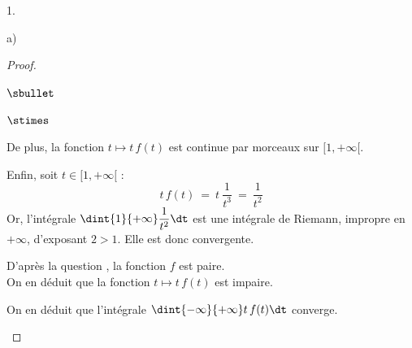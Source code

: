 \documentclass[11pt]{article}%
\begin{document}
\begin{noliste}{1.}
\begin{noliste}{a)}
\begin{proof}
\begin{noliste}{$\sbullet$}
\begin{noliste}{$\stimes$}
        \item De plus, la fonction $t \mapsto t \, f(t)$ est
          continue par morceaux sur $[1,+\infty[$.
          
        \item Enfin, soit $t \in [1,+\infty[$ :
          \[
          t \, f(t) \ = \ t \ \dfrac{1}{t^3} \ = \ \dfrac{1}{t^2}
          \]
          Or, l'intégrale $\dint{1}{+\infty} \dfrac{1}{t^2} \dt$ est
          une intégrale de Riemann, impropre en $+\infty$,
          d'exposant $2 > 1$. Elle est donc convergente.
        \end{noliste}
        
      \item D'après la question , la fonction $f$ est
        paire.\\
        On en déduit que la fonction $t \mapsto t \, f(t)$ est
        impaire.%
        
      \item On en déduit que l'intégrale $\dint{-\infty}{+\infty} t
        \, f(t) \dt$ converge. %
        

\end{noliste}
\end{proof}
\end{noliste}
\end{noliste}
\end{document}
